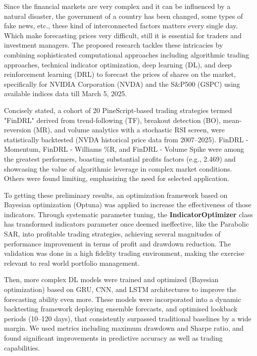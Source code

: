 Since the financial markets are very complex and it can be influenced by a natural disaster, the government of a country has been changed, some types of fake news, etc., these kind of interconnected factors matters every single day. Which make forecasting prices very difficult, still it is essential for traders and investment managers. The proposed research tackles these intricacies by combining sophisticated computational approaches including algorithmic trading approaches, technical indicator optimization, deep learning (DL), and deep reinforcement learning (DRL) to forecast the prices of shares on the market, specifically for NVIDIA Corporation (NVDA) and the S\&P500 (GSPC) using available indices data till March 5, 2025.

Concisely stated, a cohort of 20 PineScript-based trading strategies termed "FinDRL" derived from trend-following (TF), breakout detection (BO), mean-reversion (MR), and volume analytics with a stochastic RSI screen, were statistically backtested (NVDA historical price data from 2007–2025). FinDRL - Momentum, FinDRL - Williams \%R, and FinDRL - Volume Spike were among the greatest performers, boasting substantial profits factors (e.g., 2.469) and showcasing the value of algorithmic leverage in complex market conditions. Others were found limiting, emphasizing the need for selected application.

To getting these preliminary results, an optimization framework based on Bayesian optimization (Optuna) was applied to increase the effectiveness of those indicators. Through systematic parameter tuning, the \textbf{IndicatorOptimizer} class has transformed indicators parameter once deemed ineffective, like the Parabolic SAR, into profitable trading strategies, achieving several magnitudes of performance improvement in terms of profit and drawdown reduction. The validation was done in a high fidelity trading environment, making the exercise relevant to real world portfolio management.

Then, more complex DL models were trained and optimized (Bayesian optimization) based on GRU, CNN, and LSTM architectures to improve the forecasting ability even more. These models were incorporated into a dynamic backtesting framework deploying ensemble forecasts, and optimised lookback periods (10–120 days), that consistently surpassed traditional baselines by a wide margin. We used metrics including maximum drawdown and Sharpe ratio, and found significant improvements in predictive accuracy as well as trading capabilities.

